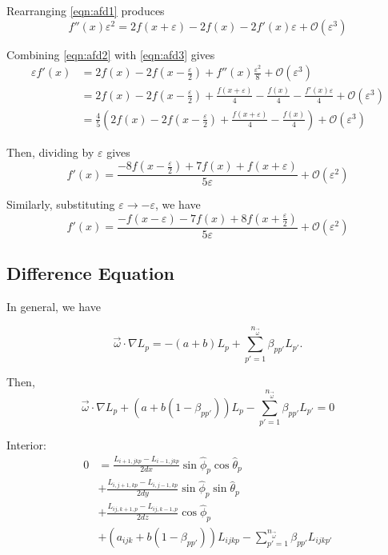 Rearranging \eqref{eqn:afd1} produces
\begin{equation}
  \label{eqn:afd3}
  f''(x)\varepsilon^2 = 2f(x+\varepsilon) - 2f(x) - 2f'(x)\varepsilon + \mathcal{O}(\varepsilon^3)
\end{equation}

Combining \eqref{eqn:afd2} with \eqref{eqn:afd3} gives
\begin{align*}
  \varepsilon f'(x) &= 2f(x) - 2f(x-\frac{\varepsilon}{2}) + f''(x)\frac{\varepsilon^2}{8} + \mathcal{O}(\varepsilon^3) \\
                    &= 2f(x) - 2f(x-\frac{\varepsilon}{2}) + \frac{f(x+\varepsilon)}{4} - \frac{f(x)}{4} - \frac{f'(x)\varepsilon}{4} + \mathcal{O}(\varepsilon^3) \\
                    &= \frac{4}{5}\left( 2f(x)-2f(x-\frac{\varepsilon}{2}) + \frac{f(x+\varepsilon)}{4} - \frac{f(x)}{4} \right) + \mathcal{O}(\varepsilon^3)
\end{align*}

Then, dividing by $\varepsilon$ gives
\begin{equation}
  f'(x) = \frac{-8f(x-\frac{\varepsilon}{2}) + 7f(x) + f(x+\varepsilon)}{5\varepsilon} + \mathcal{O}(\varepsilon^2)
\end{equation}

Similarly, substituting $\varepsilon \to -\varepsilon$, we have 
\begin{equation}
  f'(x) = \frac{- f(x-\varepsilon) - 7f(x) + 8f(x+\frac{\varepsilon}{2})}{5\varepsilon} + \mathcal{O}(\varepsilon^2)
\end{equation}


\subsection{Difference Equation}


In general, we have

\begin{equation}
  \vec{\omega} \cdot \nabla L_p = -(a+b) L_p + \sum_{p'=1}^{n_{\vec{\omega}}} \beta_{pp'}L_{p'}.
\end{equation}

Then,
\begin{equation}
  \vec{\omega} \cdot \nabla L_p + (a+b(1-\beta_{pp'}))L_p - \sum_{p'=1}^{n_{\vec{\omega}}} \beta_{pp'} L_{p'} = 0
\end{equation}

Interior:
\begin{equation}
  \begin{aligned}
    0 &= \frac{L_{i+1,jkp}-L_{i-1,jkp}}{2dx}\sin\hat{\phi}_p\cos\hat{\theta}_p \\
    &+ \frac{L_{i,j+1,kp}-L_{i,j-1,kp}}{2dy}\sin\hat{\phi}_p\sin\hat{\theta}_p \\
    &+ \frac{L_{ij,k+1,p}-L_{ij,k-1,p}}{2dz}\cos\hat{\phi}_p \\
    &+ (a_{ijk}+b(1-\beta_{pp'}))L_{ijkp}  - \sum_{p'=1}^{n_{\vec{\omega}}} \beta_{pp'} L_{ijkp'}
  \end{aligned}
\end{equation}

